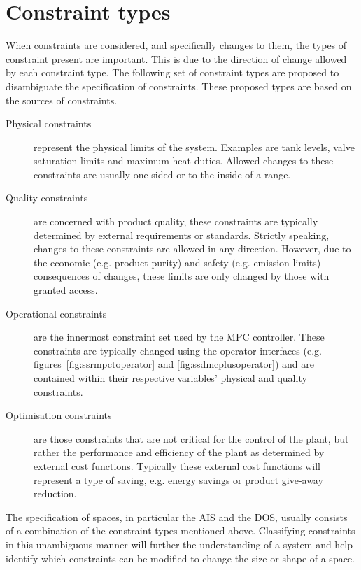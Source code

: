 \section{Constraint types}
When constraints are considered, and specifically changes to them, the types of constraint present are important.
This is due to the direction of change allowed by each constraint type.
The following set of constraint types are proposed to disambiguate the specification of constraints.
These proposed types are based on the sources of constraints.
\begin{description}
  \item [Physical constraints] represent the physical limits of the system.
  Examples are tank levels, valve saturation limits and maximum heat duties.
  Allowed changes to these constraints are usually one-sided or to the inside of a range.
  \item [Quality constraints] are concerned with product quality, these constraints are typically determined by external requirements or standards.
  Strictly speaking, changes to these constraints are allowed in any direction.
  However, due to the economic (e.g. product purity) and safety (e.g. emission limits) consequences of changes, these limits are only changed by those with granted access.
  \item [Operational constraints] are the innermost constraint set used by the MPC controller.
  These constraints are typically changed using the operator interfaces (e.g. figures~\ref{fig:ssrmpctoperator} and \ref{fig:ssdmcplusoperator}) and are contained within their respective variables' physical and quality constraints.
  \item [Optimisation constraints] are those constraints that are not critical for the control of the plant, but rather the performance and efficiency of the plant as determined by external cost functions.
  Typically these external cost functions will represent a type of saving, e.g. energy savings or product give-away reduction.
\end{description}

The specification of spaces, in particular the AIS and the DOS, usually consists of a combination of the constraint types mentioned above.
Classifying constraints in this unambiguous manner will further the understanding of a system and help identify which constraints can be modified to change the size or shape of a space.

